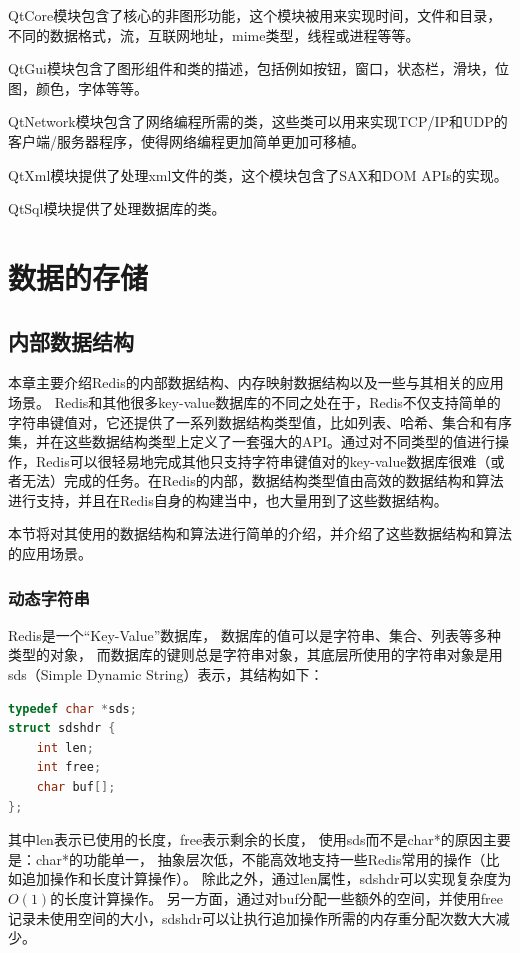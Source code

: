 \documentclass{zjutthesis}
\begin{document}
QtCore模块包含了核心的非图形功能，这个模块被用来实现时间，文件和目录，不同的数据格式，流，互联网地址，mime类型，线程或进程等等。

QtGui模块包含了图形组件和类的描述，包括例如按钮，窗口，状态栏，滑块，位图，颜色，字体等等。

QtNetwork模块包含了网络编程所需的类，这些类可以用来实现TCP/IP和UDP的客户端/服务器程序，使得网络编程更加简单更加可移植。

QtXml模块提供了处理xml文件的类，这个模块包含了SAX和DOM APIs的实现。

QtSql模块提供了处理数据库的类。


\chapter{数据的存储}
\section{内部数据结构}
本章主要介绍Redis的内部数据结构、内存映射数据结构以及一些与其相关的应用场景。
Redis和其他很多key-value数据库的不同之处在于，Redis不仅支持简单的字符串键值对，它还提供了一系列数据结构类型值，比如列表、哈希、集合和有序集，并在这些数据结构类型上定义了一套强大的API。通过对不同类型的值进行操作，Redis可以很轻易地完成其他只支持字符串键值对的key-value数据库很难（或者无法）完成的任务。在Redis的内部，数据结构类型值由高效的数据结构和算法进行支持，并且在Redis自身的构建当中，也大量用到了这些数据结构。

本节将对其使用的数据结构和算法进行简单的介绍，并介绍了这些数据结构和算法的应用场景。

\subsection{动态字符串}
Redis是一个“Key-Value”数据库， 数据库的值可以是字符串、集合、列表等多种类型的对象， 而数据库的键则总是字符串对象，其底层所使用的字符串对象是用sds（Simple Dynamic String）表示，其结构如下：
\begin{lstlisting}[language=C]
typedef char *sds;
struct sdshdr {
    int len;
    int free;
    char buf[];
};
\end{lstlisting}
其中len表示已使用的长度，free表示剩余的长度，
使用sds而不是char*的原因主要是：char*的功能单一， 抽象层次低，不能高效地支持一些Redis常用的操作（比如追加操作和长度计算操作）。
除此之外，通过len属性，sdshdr可以实现复杂度为$O(1)$的长度计算操作。
另一方面，通过对buf分配一些额外的空间，并使用free记录未使用空间的大小，sdshdr可以让执行追加操作所需的内存重分配次数大大减少。
\end{document}
